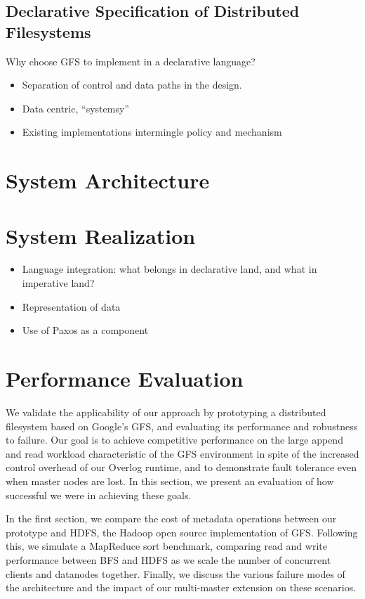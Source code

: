 \documentclass{article}
\begin{document}
\subsection{Declarative Specification of Distributed Filesystems}
Why choose GFS to implement in a declarative language?
\begin{itemize}
\item
  Separation of control and data paths in the design.

\item
  Data centric, ``systemsy''

\item
  Existing implementations intermingle policy and mechanism
\end{itemize}

\section{System Architecture}

\section{System Realization}
\begin{itemize}
\item
  Language integration: what belongs in declarative land, and what in
  imperative land?

\item
  Representation of data

\item
  Use of Paxos as a component
\end{itemize}

\section{Performance Evaluation}

We  validate the applicability of our approach by prototyping a distributed filesystem based on Google's GFS, and evaluating its performance and robustness to failure.  Our goal is to achieve competitive performance on the large append and read workload characteristic of the GFS environment in spite of the increased control overhead of our Overlog runtime, and to demonstrate fault tolerance even when master nodes are lost.  In this section, we present an evaluation of how successful we were in achieving these goals.

In the first section, we compare the cost of metadata operations between our prototype and HDFS, the Hadoop open source implementation of GFS.  Following this, we simulate a MapReduce sort benchmark, comparing read and write performance between BFS and HDFS as we 
scale the number of concurrent clients and datanodes together.  Finally, we discuss the various failure modes of the architecture and the impact of our multi-master extension on these scenarios.
\end{document}
